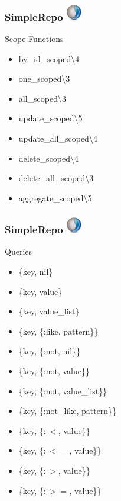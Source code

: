\documentclass{beamer}
\begin{document}

\begin{frame}[fragile]
\frametitle{SimpleRepo \hfill \includegraphics[width=0.05\textwidth]{recogizer_logo_small.png}}
\centerline{Scope Functions}
\begin{itemize}
\item by\_id\_scoped\textbackslash4
\item one\_scoped\textbackslash3
\item all\_scoped\textbackslash3
\item update\_scoped\textbackslash5
\item update\_all\_scoped\textbackslash4
\item delete\_scoped\textbackslash4
\item delete\_all\_scoped\textbackslash3
\item aggregate\_scoped\textbackslash5
\end{itemize}
\end{frame}


\begin{frame}[fragile]
\frametitle{SimpleRepo \hfill \includegraphics[width=0.05\textwidth]{recogizer_logo_small.png}}
\centerline{Queries}
\begin{itemize}
\item \{key, nil\}
\item \{key, value\}
\item \{key, value\_list\}
\item \{key, \{:like, pattern\}\}
\item \{key, \{:not, nil\}\}
\item \{key, \{:not, value\}\}
\item \{key, \{:not, value\_list\}\}
\item \{key, \{:not\_like, pattern\}\}
\item \{key, \{$:<$, value\}\}
\item \{key, \{$:<=$, value\}\}
\item \{key, \{$:>$, value\}\}
\item \{key, \{$:>=$, value\}\}
\end{itemize}
\end{frame}
\end{document}
